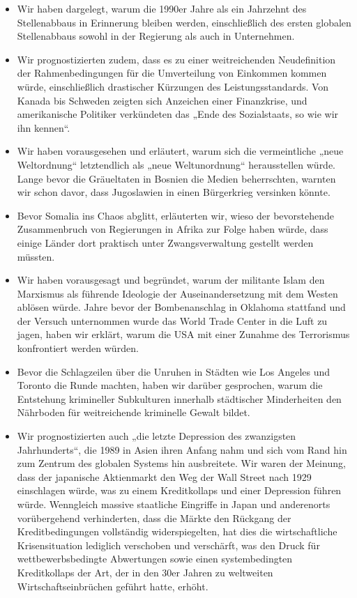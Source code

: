 \documentclass[
  a5paper,
  smalldemyvopaper,10pt,twoside,onecolumn,openright,extrafontsizes,hidelinks]{memoir}
\begin{document}
\begin{itemize}
\item
  Wir haben dargelegt, warum die 1990er Jahre als ein Jahrzehnt des
  Stellenabbaus in Erinnerung bleiben werden, einschließlich des ersten
  globalen Stellenabbaus sowohl in der Regierung als auch in
  Unternehmen.
\item
  Wir prognostizierten zudem, dass es zu einer weitreichenden
  Neudefinition der Rahmenbedingungen für die Umverteilung von Einkommen
  kommen würde, einschließlich drastischer Kürzungen des
  Leistungsstandards. Von Kanada bis Schweden zeigten sich Anzeichen
  einer Finanzkrise, und amerikanische Politiker verkündeten das „Ende
  des Sozialstaats, so wie wir ihn kennen``.
\item
  Wir haben vorausgesehen und erläutert, warum sich die vermeintliche
  „neue Weltordnung`` letztendlich als „neue Weltunordnung``
  herausstellen würde. Lange bevor die Gräueltaten in Bosnien die Medien
  beherrschten, warnten wir schon davor, dass Jugoslawien in einen
  Bürgerkrieg versinken könnte.
\item
  Bevor Somalia ins Chaos abglitt, erläuterten wir, wieso der
  bevorstehende Zusammenbruch von Regierungen in Afrika zur Folge haben
  würde, dass einige Länder dort praktisch unter Zwangsverwaltung
  gestellt werden müssten.
\item
  Wir haben vorausgesagt und begründet, warum der militante Islam den
  Marxismus als führende Ideologie der Auseinandersetzung mit dem Westen
  ablösen würde. Jahre bevor der Bombenanschlag in Oklahoma stattfand
  und der Versuch unternommen wurde das World Trade Center in die Luft
  zu jagen, haben wir erklärt, warum die USA mit einer Zunahme des
  Terrorismus konfrontiert werden würden.
\item
  Bevor die Schlagzeilen über die Unruhen in Städten wie Los Angeles und
  Toronto die Runde machten, haben wir darüber gesprochen, warum die
  Entstehung krimineller Subkulturen innerhalb städtischer Minderheiten
  den Nährboden für weitreichende kriminelle Gewalt bildet.
\item
  Wir prognostizierten auch „die letzte Depression des zwanzigsten
  Jahrhunderts``, die 1989 in Asien ihren Anfang nahm und sich vom Rand
  hin zum Zentrum des globalen Systems hin ausbreitete. Wir waren der
  Meinung, dass der japanische Aktienmarkt den Weg der Wall Street nach
  1929 einschlagen würde, was zu einem Kreditkollaps und einer
  Depression führen würde. Wenngleich massive staatliche Eingriffe in
  Japan und anderenorts vorübergehend verhinderten, dass die Märkte den
  Rückgang der Kreditbedingungen vollständig widerspiegelten, hat dies
  die wirtschaftliche Krisensituation lediglich verschoben und
  verschärft, was den Druck für wettbewerbsbedingte Abwertungen sowie
  einen systembedingten Kreditkollaps der Art, der in den 30er Jahren zu
  weltweiten Wirtschaftseinbrüchen geführt hatte, erhöht.
\end{itemize}
\end{document}
